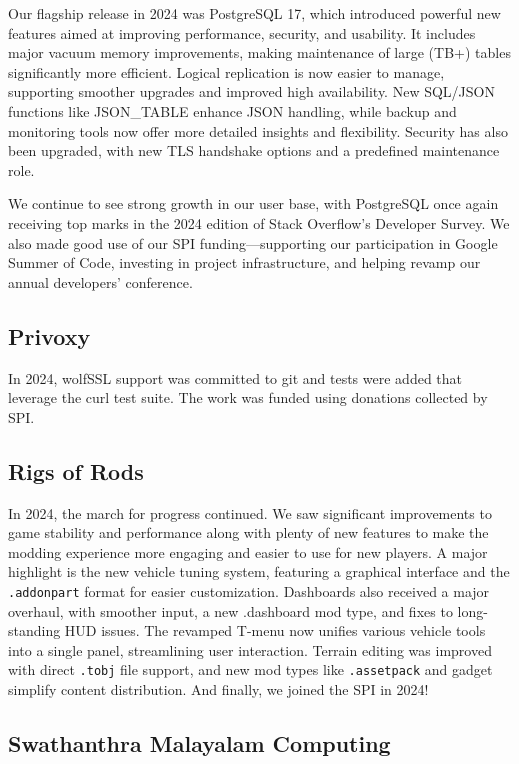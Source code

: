 \documentclass[a4paper]{report}
\begin{document}
Our flagship release in 2024 was PostgreSQL 17, which introduced powerful new features aimed at improving performance, security, and usability. It includes major vacuum memory improvements, making maintenance of large (TB+) tables significantly more efficient. Logical replication is now easier to manage, supporting smoother upgrades and improved high availability. New SQL/JSON functions like JSON\_TABLE enhance JSON handling, while backup and monitoring tools now offer more detailed insights and flexibility. Security has also been upgraded, with new TLS handshake options and a predefined maintenance role.

We continue to see strong growth in our user base, with PostgreSQL once again receiving top marks in the 2024 edition of Stack Overflow’s Developer Survey. We also made good use of our SPI funding—supporting our participation in Google Summer of Code, investing in project infrastructure, and helping revamp our annual developers’ conference.

\subsection{Privoxy}

In 2024, wolfSSL support was committed to git and tests were added that leverage the curl test suite. The work was funded using donations collected by SPI.

\subsection{Rigs of Rods}

In 2024, the march for progress continued. We saw significant improvements to game stability and performance along with plenty of new features to make the modding experience more engaging and easier to use for new players. A major highlight is the new vehicle tuning system, featuring a graphical interface and the {\tt .addonpart} format for easier customization. Dashboards also received a major overhaul, with smoother input, a new .dashboard mod type, and fixes to long-standing HUD issues. The revamped T-menu now unifies various vehicle tools into a single panel, streamlining user interaction. Terrain editing was improved with direct {\tt .tobj} file support, and new mod types like {\tt .assetpack} and gadget simplify content distribution. And finally, we joined the SPI in 2024!

\subsection{Swathanthra Malayalam Computing}
\end{document}
